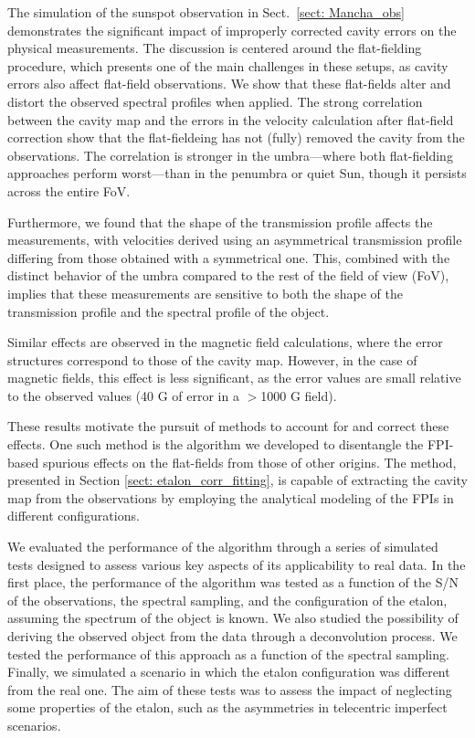 The simulation of the sunspot observation in Sect.~\ref{sect: Mancha_obs} demonstrates the significant impact of improperly corrected cavity errors on the physical measurements. The discussion is centered around the flat-fielding procedure, which presents one of the main challenges in these setups, as cavity errors also affect flat-field observations. We show that these flat-fields alter and distort the observed spectral profiles when applied. The strong correlation between the cavity map and the errors in the velocity calculation after flat-field correction show that the flat-fieldeing has not (fully) removed the cavity from the observations. The correlation is stronger in the umbra—where both flat-fielding approaches perform worst—than in the penumbra or quiet Sun, though it persists across the entire FoV.

Furthermore, we found that the shape of the transmission profile affects the measurements, with velocities derived using an asymmetrical transmission profile differing from those obtained with a symmetrical one. This, combined with the distinct behavior of the umbra compared to the rest of the field of view (FoV), implies that these measurements are sensitive to both the shape of the transmission profile and the spectral profile of the object.

Similar effects are observed in the magnetic field calculations, where the error structures correspond to those of the cavity map. However, in the case of magnetic fields, this effect is less significant, as the error values are small relative to the observed values (40 G of error in a $>$1000 G field).

These results motivate the pursuit of methods to account for and correct these effects. One such method is the algorithm we developed to disentangle the FPI-based spurious effects on the flat-fields from those of other origins. The method, presented in Section \ref{sect: etalon_corr_fitting}, is capable of extracting the cavity map from the observations by employing the analytical modeling of the FPIs in different configurations.

We evaluated the performance of the algorithm through a series of simulated tests designed to assess various key aspects of its applicability to real data. In the first place, the performance of the algorithm was tested as a function of the S/N of the observations, the spectral sampling, and the configuration of the etalon, assuming the spectrum of the object is known. We also studied the possibility of deriving the observed object from the data through a deconvolution process. We tested the performance of this approach as a function of the spectral sampling. Finally, we simulated a scenario in which the etalon configuration was different from the real one. The aim of these tests was to assess the impact of neglecting some properties of the etalon, such as the asymmetries in telecentric imperfect scenarios.

